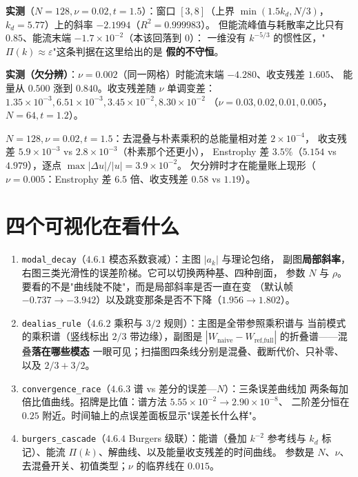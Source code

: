 \textbf{实测}（$N=128,\nu=0.02,t=1.5$）：窗口 $[3,8]$（上界 $\min(1.5k_d,N/3)$，
$k_d=5.77$）上的斜率 $-2.1994$（$R^2=0.999983$）。
但能流峰值与耗散率之比只有 $0.85$、能流末端 $-1.7\times10^{-2}$（本该回落到 $0$）：
一维没有 $k^{-5/3}$ 的惯性区，"$\Pi(k)\approx\varepsilon$"这条判据在这里给出的是
\textbf{假的不守恒}。

\textbf{实测（欠分辨）}：$\nu=0.002$（同一网格）时能流末端 $-4.280$、收支残差 $1.605$、
能量从 $0.500$ 涨到 $0.840$。收支残差随 $\nu$ 单调变差：
$1.35\times10^{-3},6.51\times10^{-3},3.45\times10^{-2},8.30\times10^{-2}$
（$\nu=0.03,0.02,0.01,0.005$，$N=64,t=1.2$）。

\begin{remark}[去混叠在积分量上几乎看不见]
$N=128,\nu=0.02,t=1.5$：去混叠与朴素乘积的总能量相对差 $2\times10^{-4}$，
收支残差 $5.9\times10^{-3}$ vs $2.8\times10^{-3}$（朴素那个还更小），
Enstrophy 差 $3.5\%$（$5.154$ vs $4.979$），逐点 $\max|\Delta u|/|u|=3.9\times10^{-2}$。
欠分辨时才在能量账上现形（$\nu=0.005$：Enstrophy 差 $6.5$ 倍、收支残差 $0.58$ vs $1.19$）。
\end{remark}

\section{四个可视化在看什么}

\begin{enumerate}
  \item \texttt{modal\_decay}（$4.6.1$ 模态系数衰减）：主图 $|a_k|$ 与理论包络，
        副图\textbf{局部斜率}，右图三类光滑性的误差阶梯。它可以切换两种基、四种剖面，
        参数 $N$ 与 $\rho$。要看的不是"曲线陡不陡"，而是局部斜率是否一直在变
        （默认帧 $-0.737\to-3.942$）以及跳变那条是否不下降（$1.956\to1.802$）。
  \item \texttt{dealias\_rule}（$4.6.2$ 乘积与 $3/2$ 规则）：主图是全带参照乘积谱与
        当前模式的乘积谱（竖线标出 $2/3$ 带边缘），副图是
        $|W_{\text{naive}}-W_{\text{ref,full}}|$ 的折叠谱——混叠\textbf{落在哪些模态}
        一眼可见；扫描图四条线分别是混叠、截断代价、只补零、以及 $2/3+3/2$。
  \item \texttt{convergence\_race}（$4.6.3$ 谱 vs 差分的误差—$N$）：三条误差曲线加
        两条每加倍比值曲线。招牌是比值：谱方法 $5.55\times10^{-2}\to2.90\times10^{-8}$、
        二阶差分恒在 $0.25$ 附近。时间轴上的点误差面板显示"误差长什么样"。
  \item \texttt{burgers\_cascade}（$4.6.4$ Burgers 级联）：能谱（叠加
        $k^{-2}$ 参考线与 $k_d$ 标记）、能流 $\Pi(k)$、解曲线、以及能量收支残差的时间曲线。
        参数是 $N$、$\nu$、去混叠开关、初值类型；$\nu$ 的临界线在 $0.015$。
\end{enumerate}


